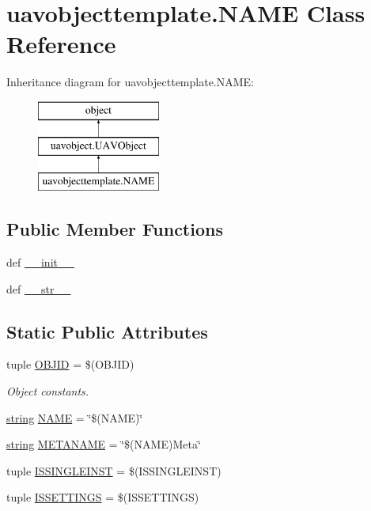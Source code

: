 \hypertarget{classuavobjecttemplate_1_1_n_a_m_e}{\section{uavobjecttemplate.\-N\-A\-M\-E Class Reference}
\label{classuavobjecttemplate_1_1_n_a_m_e}
}
Inheritance diagram for uavobjecttemplate.\-N\-A\-M\-E\-:\begin{figure}[H]
\begin{center}
\leavevmode
\includegraphics[height=3.000000cm]{classuavobjecttemplate_1_1_n_a_m_e}
\end{center}
\end{figure}
\subsection*{Public Member Functions}
\begin{DoxyCompactItemize}
\item 
def \hyperlink{classuavobjecttemplate_1_1_n_a_m_e_aa97857632b4376be8b6d917e66f1aa33}{\-\_\-\-\_\-init\-\_\-\-\_\-}
\item 
def \hyperlink{classuavobjecttemplate_1_1_n_a_m_e_a591135272acdb1690e9435e299294ffa}{\-\_\-\-\_\-str\-\_\-\-\_\-}
\end{DoxyCompactItemize}
\subsection*{Static Public Attributes}
\begin{DoxyCompactItemize}
\item 
tuple \hyperlink{classuavobjecttemplate_1_1_n_a_m_e_a82049c81486660578e43d32818270eb6}{O\-B\-J\-I\-D} = \$(O\-B\-J\-I\-D)
\begin{DoxyCompactList}\small\item\em Object constants. \end{DoxyCompactList}\item 
\hyperlink{glext_8h_aa81bcd27b2208041814b4beacb88c2d9}{string} \hyperlink{classuavobjecttemplate_1_1_n_a_m_e_aa4152a2f11973340936522b0ee53b625}{N\-A\-M\-E} = \char`\"{}\$(N\-A\-M\-E)\char`\"{}
\item 
\hyperlink{glext_8h_aa81bcd27b2208041814b4beacb88c2d9}{string} \hyperlink{classuavobjecttemplate_1_1_n_a_m_e_a73916d6c625f956ee007d7b1e09ff097}{M\-E\-T\-A\-N\-A\-M\-E} = \char`\"{}\$(N\-A\-M\-E)Meta\char`\"{}
\item 
tuple \hyperlink{classuavobjecttemplate_1_1_n_a_m_e_afc79fbb87532580147383d40c5d7eb31}{I\-S\-S\-I\-N\-G\-L\-E\-I\-N\-S\-T} = \$(I\-S\-S\-I\-N\-G\-L\-E\-I\-N\-S\-T)
\item 
tuple \hyperlink{classuavobjecttemplate_1_1_n_a_m_e_a96554299c9ee77ca7b85b9bce0cf5e15}{I\-S\-S\-E\-T\-T\-I\-N\-G\-S} = \$(I\-S\-S\-E\-T\-T\-I\-N\-G\-S)
\end{DoxyCompactItemize}
